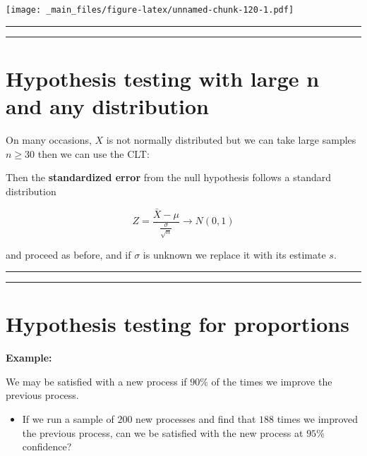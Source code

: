 \documentclass[
]{book}
\providecommand{\tightlist}{%
  \setlength{\itemsep}{0pt}\setlength{\parskip}{0pt}}
\begin{document}
\texttt{[image: \_main\_files/figure-latex/unnamed-chunk-120-1.pdf]}

\begin{center}\rule{0.5\linewidth}{0.5pt}\end{center}

\begin{center}\rule{0.5\linewidth}{0.5pt}\end{center}

\hypertarget{hypothesis-testing-with-large-n-and-any-distribution}{%
\section{Hypothesis testing with large n and any distribution}\label{hypothesis-testing-with-large-n-and-any-distribution}}

On many occasions, \(X\) is not normally distributed but we can take large samples \(n \ge 30\) then we can use the CLT:

Then the \textbf{standardized error} from the null hypothesis follows a standard distribution

\[Z=\frac{\bar{X}-\mu}{\frac{\sigma}{\sqrt{n}}}  \rightarrow N(0,1)\]

and proceed as before, and if \(\sigma\) is unknown we replace it with its estimate \(s\).

\begin{center}\rule{0.5\linewidth}{0.5pt}\end{center}

\begin{center}\rule{0.5\linewidth}{0.5pt}\end{center}

\hypertarget{hypothesis-testing-for-proportions}{%
\section{Hypothesis testing for proportions}\label{hypothesis-testing-for-proportions}}

\textbf{Example:}

We may be satisfied with a new process if \(90\%\) of the times we improve the previous process.

\begin{itemize}
\tightlist
\item
  If we run a sample of \(200\) new processes and find that \(188\) times we improved the previous process, can we be satisfied with the new process at \(95\%\) confidence?
\end{itemize}
\end{document}

